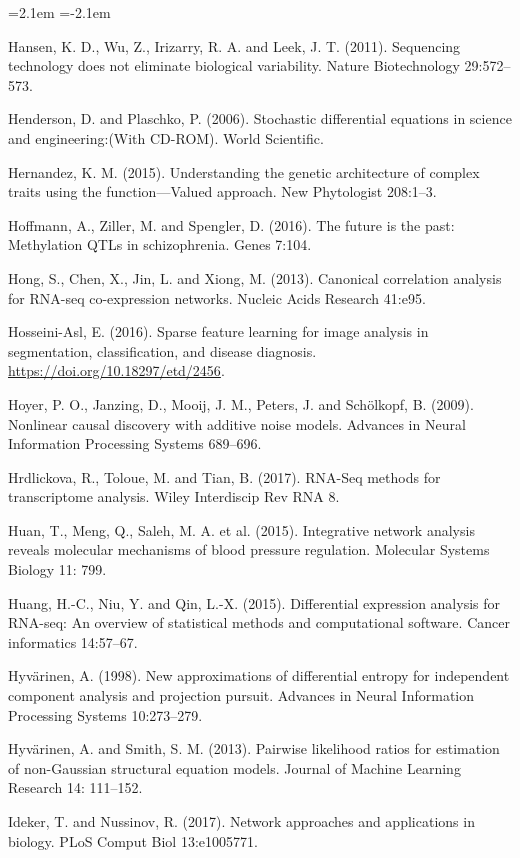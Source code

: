 \begin{list}{}{\leftmargin=2.1em  
  \itemindent=-2.1em \parsep=0pt \itemsep=2pt \topsep=0pt}
\item Hansen, K. D., Wu, Z., Irizarry, R. A. and Leek, J. T. (2011). Sequencing technology does not eliminate biological variability. Nature Biotechnology 29:572--573.
\item Henderson, D. and Plaschko, P. (2006). Stochastic differential equations in science and engineering:(With CD-ROM). World Scientific.
\item Hernandez, K. M. (2015). Understanding the genetic architecture of complex traits using the function---Valued approach. New Phytologist 208:1--3.
\item Hoffmann, A., Ziller, M. and Spengler, D. (2016). The future is the past: Methylation QTLs in schizophrenia. Genes 7:104.
\item Hong, S., Chen, X., Jin, L. and Xiong, M. (2013). Canonical correlation analysis for RNA-seq co-expression networks. Nucleic Acids Research 41:e95.
\item Hosseini-Asl, E. (2016). Sparse feature learning for image analysis in segmentation, classification, and disease diagnosis. \url{https://doi.org/10.18297/etd/2456}.
\item Hoyer, P. O., Janzing, D., Mooij, J. M., Peters, J. and Schölkopf, B. (2009). Nonlinear causal discovery with additive noise models. Advances in Neural Information Processing Systems 689--696.
\item Hrdlickova, R., Toloue, M. and Tian, B. (2017). RNA-Seq methods for transcriptome analysis. Wiley Interdiscip Rev RNA 8.
\item Huan, T., Meng, Q., Saleh, M. A. et al. (2015). Integrative network analysis reveals molecular mechanisms of blood pressure regulation. Molecular Systems Biology 11: 799.
\item Huang, H.-C., Niu, Y. and Qin, L.-X. (2015). Differential expression analysis for RNA-seq: An overview of statistical methods and computational software. Cancer informatics 14:57--67.
\item Hyvärinen, A. (1998). New approximations of differential entropy for independent component analysis and projection pursuit. Advances in Neural Information Processing Systems 10:273--279.
\item Hyvärinen, A. and Smith, S. M. (2013). Pairwise likelihood ratios for estimation of non-Gaussian structural equation models. Journal of Machine Learning Research 14: 111--152.
\item Ideker, T. and Nussinov, R. (2017). Network approaches and applications in biology. PLoS Comput Biol 13:e1005771.

\end{list}
